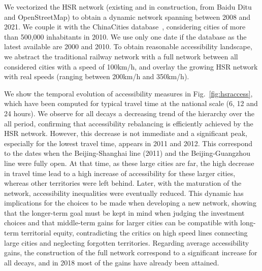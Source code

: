 We vectorized the HSR network (existing and in construction, from Baidu Ditu and OpenStreetMap) to obtain a dynamic network spanning between 2008 and 2021. We couple it with the ChinaCities database~\citep{swerts2017database}, considering cities of more than 500,000 inhabitants in 2010. We use only one date if the database as the latest available are 2000 and 2010. To obtain reasonable accessibility landscape, we abstract the traditional railway network with a full network between all considered cities with a speed of 100km/h, and overlay the growing HSR network with real speeds (ranging between 200km/h and 350km/h).

We show the temporal evolution of accessibility measures in Fig.~\ref{fig:hsraccess}, which have been computed for typical travel time at the national scale (6, 12 and 24 hours). We observe for all decays a decreasing trend of the hierarchy over the all period, confirming that accessibility rebalancing is efficiently achieved by the HSR network. However, this decrease is not immediate and a significant peak, especially for the lowest travel time, appears in 2011 and 2012. This correspond to the dates when the Beijing-Shanghai line (2011) and the Beijing-Guangzhou line were fully open. At that time, as these large cities are far, the high decrease in travel time lead to a high increase of accessibility for these larger cities, whereas other territories were left behind. Later, with the maturation of the network, accessibility inequalities were eventually reduced. This dynamic has implications for the choices to be made when developing a new network, showing that the longer-term goal must be kept in mind when judging the investment choices and that middle-term gains for larger cities can be compatible with long-term territorial equity, contradicting the critics on high speed lines connecting large cities and neglecting forgotten territories. Regarding average accessibility gains, the construction of the full network correspond to a significant increase for all decays, and in 2018 most of the gains have already been attained.


